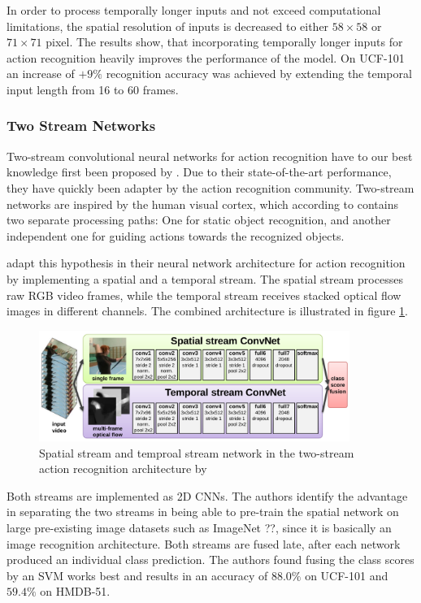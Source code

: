 In order to process temporally longer inputs and not exceed computational limitations, the spatial resolution of inputs is decreased to either $58 \times 58$ or $71 \times 71$ pixel.
The results show, that incorporating temporally longer inputs for action recognition heavily improves the performance of the model.
On UCF-101 an increase of $+9\%$ recognition accuracy was achieved by extending the temporal input length from 16 to 60 frames.


\subsubsection{Two Stream Networks}
Two-stream convolutional neural networks for action recognition have to our best knowledge first been proposed by \textcite{simonyan_two-stream_2014}.
Due to their state-of-the-art performance, they have quickly been adapter by the action recognition community.
Two-stream networks are inspired by the human visual cortex, which according to \cite{goodale_separate_1992} contains two separate processing paths: One for static object recognition, and another independent one for guiding actions towards the recognized objects.

\textcite{simonyan_two-stream_2014} adapt this hypothesis in their neural network architecture for action recognition by implementing a spatial and a temporal stream.
The spatial stream processes raw RGB video frames, while the temporal stream receives stacked optical flow images in different channels.
The combined architecture is illustrated in figure \ref{fig:twostream_architecture}.

\begin{figure}[H]
    \centering
    \includegraphics[width=0.9\textwidth]{img_related/twostream_architecture}
    \caption{Spatial stream and temproal stream network in the two-stream action recognition architecture by \textcite{simonyan_two-stream_2014}}
    \label{fig:twostream_architecture}
\end{figure}

Both streams are implemented as 2D CNNs.
The authors identify the advantage in separating the two streams in being able to pre-train the spatial network on large pre-existing image datasets such as ImageNet ??, since it is basically an image recognition architecture.
Both streams are fused late, after each network produced an individual class prediction.
The authors found fusing the class scores by an SVM works best and results in an accuracy of $88.0\%$ on UCF-101 and $59.4\%$ on HMDB-51.

